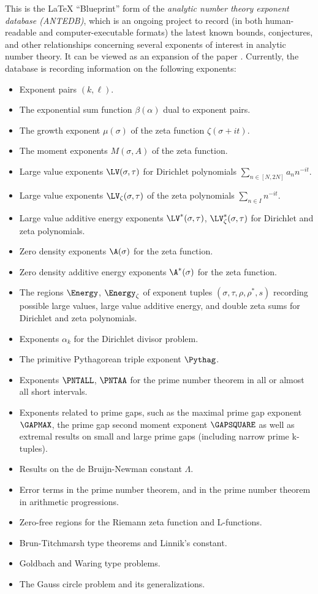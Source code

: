 This is the LaTeX ``Blueprint'' form of the \emph{analytic number theory exponent database (ANTEDB)}, which is an ongoing project to record (in both human-readable and computer-executable formats) the latest known bounds, conjectures, and other relationships concerning several exponents of interest in analytic number theory.  It can be viewed as an expansion of the paper \cite{trudgian-yang}. Currently, the database is recording information on the following exponents:

\begin{itemize}
\item Exponent pairs $(k,\ell)$.
\item The exponential sum function $\beta(\alpha)$ dual to exponent pairs.
\item The growth exponent $\mu(\sigma)$ of the zeta function $\zeta(\sigma+it)$.
\item The moment exponents $M(\sigma,A)$ of the zeta function.
\item Large value exponents $\LV(\sigma, \tau)$ for Dirichlet polynomials $\sum_{n \in [N,2N]} a_n n^{-it}$.
\item Large value exponents $\LV_\zeta(\sigma, \tau)$ of the zeta polynomials $\sum_{n \in I} n^{-it}$.
\item Large value additive energy exponents $\LV^*(\sigma, \tau)$, $\LV^*_\zeta(\sigma, \tau)$ for Dirichlet and zeta polynomials.
\item Zero density exponents $\A(\sigma)$ for the zeta function.
\item Zero density additive energy exponents $\A^*(\sigma)$ for the zeta function.
\item The regions $\Energy$, $\Energy_\zeta$ of exponent tuples $(\sigma,\tau,\rho,\rho^*,s)$ recording possible large values, large value additive energy, and double zeta sums for Dirichlet and zeta polynomials.
\item Exponents $\alpha_k$ for the Dirichlet divisor problem.
\item The primitive Pythagorean triple exponent $\Pythag$.
\item Exponents $\PNTALL$, $\PNTAA$ for the prime number theorem in all or almost all short intervals.
\item Exponents related to prime gaps, such as the maximal prime gap exponent $\GAPMAX$, the prime gap second moment exponent $\GAPSQUARE$ as well as extremal results on small and large prime gaps (including narrow prime k-tuples).
\item Results on the de Bruijn-Newman constant $\Lambda$.
\item Error terms in the prime number theorem, and in the prime number theorem in arithmetic progressions.
\item Zero-free regions for the Riemann zeta function and L-functions.
\item Brun-Titchmarsh type theorems and Linnik's constant.
\item Goldbach and Waring type problems.
\item The Gauss circle problem and its generalizations.
\end{itemize}

